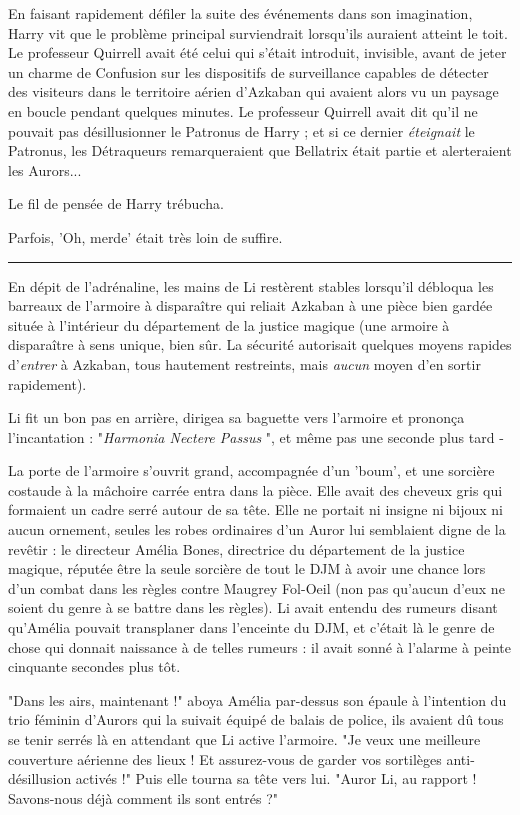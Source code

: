 En faisant rapidement défiler la suite des événements dans son imagination, Harry vit que le problème principal surviendrait lorsqu'ils auraient atteint le toit. Le professeur Quirrell avait été celui qui s'était introduit, invisible, avant de jeter un charme de Confusion sur les dispositifs de surveillance capables de détecter des visiteurs dans le territoire aérien d'Azkaban qui avaient alors vu un paysage en boucle pendant quelques minutes. Le professeur Quirrell avait dit qu'il ne pouvait pas désillusionner le Patronus de Harry ; et si ce dernier \emph{éteignait}  le Patronus, les Détraqueurs remarqueraient que Bellatrix était partie et alerteraient les Aurors...

Le fil de pensée de Harry trébucha.

Parfois, 'Oh, merde' était très loin de suffire.
\par\noindent\rule{\textwidth}{0.4pt}
En dépit de l'adrénaline, les mains de Li restèrent stables lorsqu'il débloqua les barreaux de l'armoire à disparaître qui reliait Azkaban à une pièce bien gardée située à l'intérieur du département de la justice magique (une armoire à disparaître à sens unique, bien sûr. La sécurité autorisait quelques moyens rapides d'\emph{entrer}  à Azkaban, tous hautement restreints, mais \emph{aucun}  moyen d'en sortir rapidement).

Li fit un bon pas en arrière, dirigea sa baguette vers l'armoire et prononça l'incantation : "\emph{Harmonia Nectere Passus} ", et même pas une seconde plus tard -

La porte de l'armoire s'ouvrit grand, accompagnée d'un 'boum', et une sorcière costaude à la mâchoire carrée entra dans la pièce. Elle avait des cheveux gris qui formaient un cadre serré autour de sa tête. Elle ne portait ni insigne ni bijoux ni aucun ornement, seules les robes ordinaires d'un Auror lui semblaient digne de la revêtir : le directeur Amélia Bones, directrice du département de la justice magique, réputée être la seule sorcière de tout le DJM à avoir une chance lors d'un combat dans les règles contre Maugrey Fol-Oeil (non pas qu'aucun d'eux ne soient du genre à se battre dans les règles). Li avait entendu des rumeurs disant qu'Amélia pouvait transplaner dans l'enceinte du DJM, et c'était là le genre de chose qui donnait naissance à de telles rumeurs : il avait sonné à l'alarme à peinte cinquante secondes plus tôt.

"Dans les airs, maintenant !" aboya Amélia par-dessus son épaule à l'intention du trio féminin d'Aurors qui la suivait équipé de balais de police, ils avaient dû tous se tenir serrés là en attendant que Li active l'armoire. "Je veux une meilleure couverture aérienne des lieux ! Et assurez-vous de garder vos sortilèges anti-désillusion activés !" Puis elle tourna sa tête vers lui. "Auror Li, au rapport ! Savons-nous déjà comment ils sont entrés ?"

